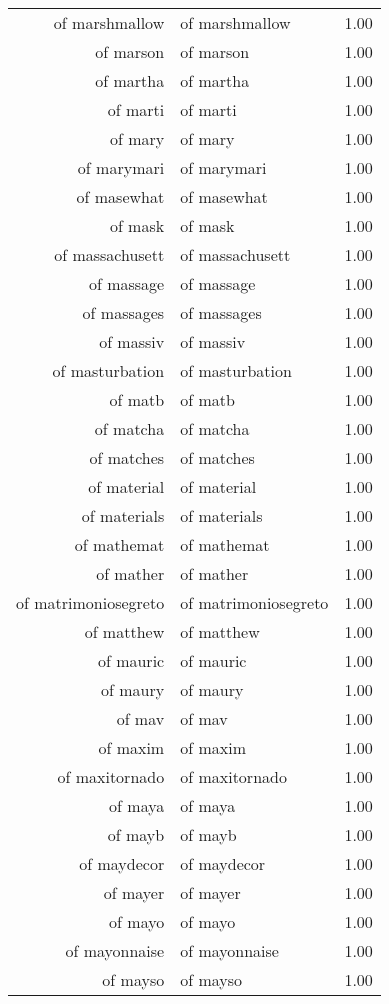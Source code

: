 \begin{table}[ht]
\begin{tabular}{rlr}
  of marshmallow & of marshmallow & 1.00 \\ 
  of marson & of marson & 1.00 \\ 
  of martha & of martha & 1.00 \\ 
  of marti & of marti & 1.00 \\ 
  of mary & of mary & 1.00 \\ 
  of marymari & of marymari & 1.00 \\ 
  of masewhat & of masewhat & 1.00 \\ 
  of mask & of mask & 1.00 \\ 
  of massachusett & of massachusett & 1.00 \\ 
  of massage & of massage & 1.00 \\ 
  of massages & of massages & 1.00 \\ 
  of massiv & of massiv & 1.00 \\ 
  of masturbation & of masturbation & 1.00 \\ 
  of matb & of matb & 1.00 \\ 
  of matcha & of matcha & 1.00 \\ 
  of matches & of matches & 1.00 \\ 
  of material & of material & 1.00 \\ 
  of materials & of materials & 1.00 \\ 
  of mathemat & of mathemat & 1.00 \\ 
  of mather & of mather & 1.00 \\ 
  of matrimoniosegreto & of matrimoniosegreto & 1.00 \\ 
  of matthew & of matthew & 1.00 \\ 
  of mauric & of mauric & 1.00 \\ 
  of maury & of maury & 1.00 \\ 
  of mav & of mav & 1.00 \\ 
  of maxim & of maxim & 1.00 \\ 
  of maxitornado & of maxitornado & 1.00 \\ 
  of maya & of maya & 1.00 \\ 
  of mayb & of mayb & 1.00 \\ 
  of maydecor & of maydecor & 1.00 \\ 
  of mayer & of mayer & 1.00 \\ 
  of mayo & of mayo & 1.00 \\ 
  of mayonnaise & of mayonnaise & 1.00 \\ 
  of mayso & of mayso & 1.00 \\ 

\end{tabular}
\end{table}
